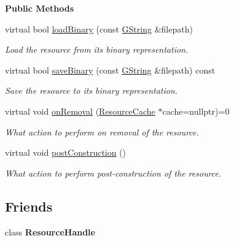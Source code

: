 \begin{Indent}\textbf{ Public Methods}\par
\begin{DoxyCompactItemize}
\item 
virtual bool \mbox{\hyperlink{classrev_1_1_resource_aad752eceda9dab7ea282fb50b894ad4c}{load\+Binary}} (const \mbox{\hyperlink{classrev_1_1_g_string}{G\+String}} \&filepath)
\begin{DoxyCompactList}\small\item\em Load the resource from its binary representation. \end{DoxyCompactList}\item 
virtual bool \mbox{\hyperlink{classrev_1_1_resource_afbd64f3d18060ce32a995dbfb5472f91}{save\+Binary}} (const \mbox{\hyperlink{classrev_1_1_g_string}{G\+String}} \&filepath) const
\begin{DoxyCompactList}\small\item\em Save the resource to its binary representation. \end{DoxyCompactList}\item 
\mbox{\label{classrev_1_1_resource_a0601134f219b9f9a5987b945e215f62f}} 
virtual void \mbox{\hyperlink{classrev_1_1_resource_a0601134f219b9f9a5987b945e215f62f}{on\+Removal}} (\mbox{\hyperlink{classrev_1_1_resource_cache}{Resource\+Cache}} $\ast$cache=nullptr)=0
\begin{DoxyCompactList}\small\item\em What action to perform on removal of the resource. \end{DoxyCompactList}\item 
virtual void \mbox{\hyperlink{classrev_1_1_resource_a8a6daa71820d88c86bc6c0aa474d1af7}{post\+Construction}} ()
\begin{DoxyCompactList}\small\item\em What action to perform post-\/construction of the resource. \end{DoxyCompactList}\end{DoxyCompactItemize}
\end{Indent}
\subsection*{Friends}
\begin{DoxyCompactItemize}
\item 
\mbox{\label{classrev_1_1_resource_a057b608b4c5af1ff11a81128f106fa9a}} 
class {\bfseries Resource\+Handle}
\end{DoxyCompactItemize}
